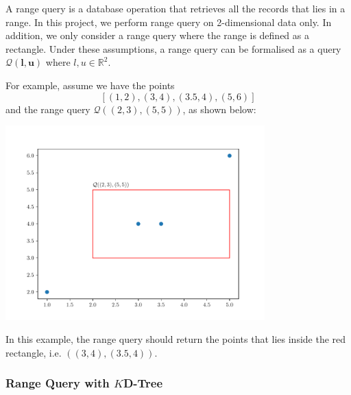 A range query is a database operation that retrieves all the records that lies in a range. In this project, we perform range query on 2-dimensional data only. In addition, we only consider a range query where the range is defined as a rectangle. Under these assumptions, a range query can be formalised as a query $\mathcal{Q}(\boldsymbol{l}, \boldsymbol{u})$ where $l,u\in\mathbb{R}^2$.

\begin{mscexample}
	For example, assume we have the points
	$$
	[(1,2), (3,4), (3.5, 4), (5,6)]
	$$
	and the range query $\mathcal{Q}((2,3), (5,5))$, as shown below:
	
	\begin{minipage}[t]{\linewidth}
	\centering
   	\includegraphics[width=10cm]{graphs/implementation/queries/range_query.pdf}
   	\label{fig:range_query_demo}
	\end{minipage}
	
In this example, the range query should return the points that lies inside the red rectangle, i.e. $((3,4), (3.5, 4))$.

\end{mscexample}

\subsubsection{Range Query with $K$D-Tree}

